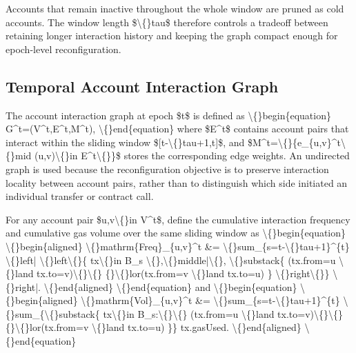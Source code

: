 \documentclass{article}
\begin{document}
Accounts that remain inactive throughout the whole window are pruned as cold accounts. The window length \$\textbackslash\{\}tau\$ therefore controls a tradeoff between retaining longer interaction history and keeping the graph compact enough for epoch-level reconfiguration.

\subsection{Temporal Account Interaction Graph}\label{sec:temporal-account-interaction-graph}

The account interaction graph at epoch \$t\$ is defined as
\textbackslash\{\}begin\{equation\}
G^t=(V^t,E^t,M^t),
\textbackslash\{\}end\{equation\}
where \$E^t\$ contains account pairs that interact within the sliding window \$[t-\textbackslash\{\}tau+1,t]\$, and \$M^t=\textbackslash\{\}\{e\_\{u,v\}^t\textbackslash\{\}mid (u,v)\textbackslash\{\}in E^t\textbackslash\{\}\}\$ stores the corresponding edge weights. An undirected graph is used because the reconfiguration objective is to preserve interaction locality between account pairs, rather than to distinguish which side initiated an individual transfer or contract call.

For any account pair \$u,v\textbackslash\{\}in V^t\$, define the cumulative interaction frequency and cumulative gas volume over the same sliding window as
\textbackslash\{\}begin\{equation\}
\textbackslash\{\}begin\{aligned\}
\textbackslash\{\}mathrm\{Freq\}\_\{u,v\}^t
\&=
\textbackslash\{\}sum\_\{s=t-\textbackslash\{\}tau+1\}^\{t\}
\textbackslash\{\}left|
\textbackslash\{\}left\textbackslash\{\}\{
tx\textbackslash\{\}in B\_s \textbackslash\{\},\textbackslash\{\}middle|\textbackslash\{\},
\textbackslash\{\}substack\{
(tx.from=u \textbackslash\{\}land tx.to=v)\textbackslash\{\}\textbackslash\{\}
\{\}\textbackslash\{\}lor(tx.from=v \textbackslash\{\}land tx.to=u)
\}
\textbackslash\{\}right\textbackslash\{\}\}
\textbackslash\{\}right|.
\textbackslash\{\}end\{aligned\}
\textbackslash\{\}end\{equation\}
and
\textbackslash\{\}begin\{equation\}
\textbackslash\{\}begin\{aligned\}
\textbackslash\{\}mathrm\{Vol\}\_\{u,v\}^t
\&=
\textbackslash\{\}sum\_\{s=t-\textbackslash\{\}tau+1\}^\{t\}
\textbackslash\{\}sum\_\{\textbackslash\{\}substack\{
tx\textbackslash\{\}in B\_s:\textbackslash\{\}\textbackslash\{\}
(tx.from=u \textbackslash\{\}land tx.to=v)\textbackslash\{\}\textbackslash\{\}
\{\}\textbackslash\{\}lor(tx.from=v \textbackslash\{\}land tx.to=u)
\}\}
tx.gasUsed.
\textbackslash\{\}end\{aligned\}
\textbackslash\{\}end\{equation\}
\end{document}
